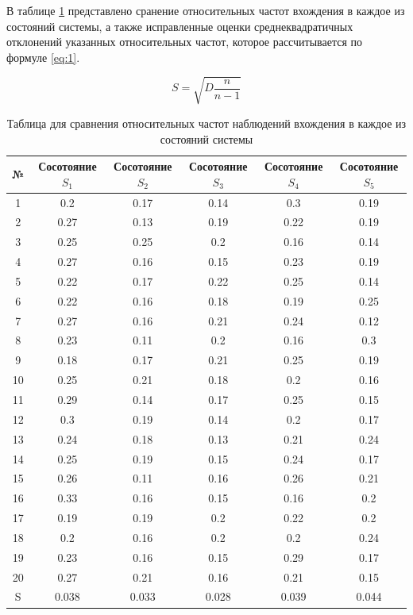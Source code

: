 В таблице \ref{table:Table_for_cheking_chislo_vlhozdeniy} представлено сранение относительных частот вхождения в каждое из состояний системы,
а также исправленные оценки среднеквадратичных отклонений указанных относительных частот, которое рассчитывается по формуле \ref{eq:1}.

\[
S = \sqrt{D \frac{n}{n-1}}
\tag{1} \label{eq:1}
\]

\begin{center}
\begin{table}[H]
\centering
\begin{tabular}{| c | c | c | c | c | c |}
\hline
№ & Сосотояние $S_1$ & Сосотояние $S_2$ & Сосотояние $S_3$ & Сосотояние $S_4$ & Сосотояние $S_5$ \\ \hline
  1 & 0.2 & 0.17 & 0.14 & 0.3 & 0.19 \\
 \hline 2 & 0.27 & 0.13 & 0.19 & 0.22 & 0.19 \\
 \hline 3 & 0.25 & 0.25 & 0.2 & 0.16 & 0.14 \\
 \hline 4 & 0.27 & 0.16 & 0.15 & 0.23 & 0.19 \\
 \hline 5 & 0.22 & 0.17 & 0.22 & 0.25 & 0.14 \\
 \hline 6 & 0.22 & 0.16 & 0.18 & 0.19 & 0.25 \\
 \hline 7 & 0.27 & 0.16 & 0.21 & 0.24 & 0.12 \\
 \hline 8 & 0.23 & 0.11 & 0.2 & 0.16 & 0.3 \\
 \hline 9 & 0.18 & 0.17 & 0.21 & 0.25 & 0.19 \\
 \hline 10 & 0.25 & 0.21 & 0.18 & 0.2 & 0.16 \\
 \hline 11 & 0.29 & 0.14 & 0.17 & 0.25 & 0.15 \\
 \hline 12 & 0.3 & 0.19 & 0.14 & 0.2 & 0.17 \\
 \hline 13 & 0.24 & 0.18 & 0.13 & 0.21 & 0.24 \\
 \hline 14 & 0.25 & 0.19 & 0.15 & 0.24 & 0.17 \\
 \hline 15 & 0.26 & 0.11 & 0.16 & 0.26 & 0.21 \\
 \hline 16 & 0.33 & 0.16 & 0.15 & 0.16 & 0.2 \\
 \hline 17 & 0.19 & 0.19 & 0.2 & 0.22 & 0.2 \\
 \hline 18 & 0.2 & 0.16 & 0.2 & 0.2 & 0.24 \\
 \hline 19 & 0.23 & 0.16 & 0.15 & 0.29 & 0.17 \\
 \hline 20 & 0.27 & 0.21 & 0.16 & 0.21 & 0.15 \\
 \hline \hline
S & 0.038 & 0.033 & 0.028 & 0.039 & 0.044 \\ \hline
\end{tabular}
\caption{Таблица для сравнения относительных частот наблюдений вхождения в каждое из состояний системы}
\label{table:Table_for_cheking_chislo_vlhozdeniy}
\end{table}
\end{center}


